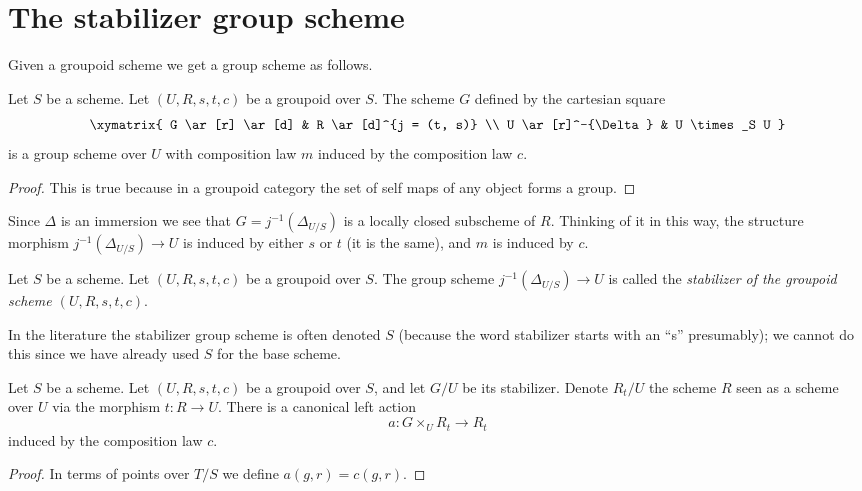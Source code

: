 \section{The stabilizer group scheme}
\label{section-stabilizer}

\noindent
Given a groupoid scheme we get a group scheme as follows.

\begin{lemma}
\label{lemma-groupoid-stabilizer}
Let $S$ be a scheme.
Let $(U, R, s, t, c)$ be a groupoid over $S$.
The scheme $G$ defined by the cartesian square
$$
\xymatrix{
G \ar[r] \ar[d] & R \ar[d]^{j = (t, s)} \\
U \ar[r]^-{\Delta} & U \times_S U
}
$$
is a group scheme over $U$ with composition law
$m$ induced by the composition law $c$.
\end{lemma}

\begin{proof}
This is true because in a groupoid category the
set of self maps of any object forms a group.
\end{proof}

\noindent
Since $\Delta$ is an immersion we see that $G = j^{-1}(\Delta_{U/S})$
is a locally closed subscheme of $R$. Thinking of it in this way,
the structure morphism $j^{-1}(\Delta_{U/S}) \to U$ is induced by
either $s$ or $t$ (it is the same), and $m$ is induced by $c$.

\begin{definition}
\label{definition-stabilizer-groupoid}
Let $S$ be a scheme.
Let $(U, R, s, t, c)$ be a groupoid over $S$.
The group scheme $j^{-1}(\Delta_{U/S})\to U$
is called the {\it stabilizer of the groupoid scheme
$(U, R, s, t, c)$}.
\end{definition}

\noindent
In the literature the stabilizer group scheme is often denoted $S$
(because the word stabilizer starts with an ``s'' presumably);
we cannot do this since we have already used $S$ for the base scheme.

\begin{lemma}
\label{lemma-groupoid-action-stabilizer}
Let $S$ be a scheme.
Let $(U, R, s, t, c)$ be a groupoid over $S$, and let $G/U$ be its stabilizer.
Denote $R_t/U$ the scheme $R$ seen as a scheme over $U$ via the
morphism $t : R \to U$.
There is a canonical left action
$$
a : G \times_U R_t \longrightarrow R_t
$$
induced by the composition law $c$.
\end{lemma}

\begin{proof}
In terms of points over $T/S$ we define $a(g, r) = c(g, r)$.
\end{proof}

